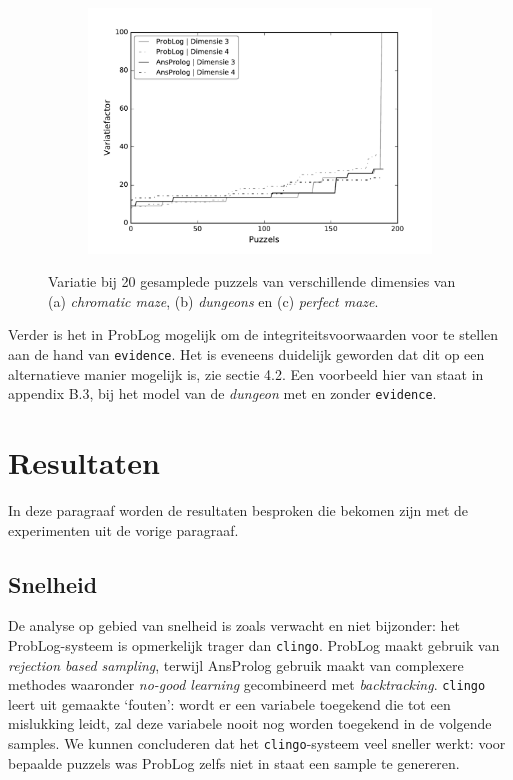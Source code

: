 \documentclass{article}
\begin{document}
\begin{figure}[t]
\begin{subfigure}{.33\textwidth}
  \includegraphics[width=\linewidth]{Grafieken/Variatie/Perfect Maze/perfectmaze.pdf}
  \caption{}
  \label{fig:sub3}
\end{subfigure}
\caption{Variatie bij 20 gesamplede puzzels van verschillende dimensies van (a) \textit{chromatic maze}, (b) \textit{dungeons} en (c) \textit{perfect maze}.}
\label{fig:test}
\end{figure}

Verder is het in ProbLog mogelijk om de integriteitsvoorwaarden voor te stellen aan de hand van \texttt{evidence}. Het is eveneens duidelijk geworden dat dit op een alternatieve manier mogelijk is, zie sectie 4.2. Een voorbeeld hier van staat in appendix B.3, bij het model van de \textit{dungeon} met en zonder \texttt{evidence}.



\section{Resultaten}
In deze paragraaf worden de resultaten besproken die bekomen zijn met de experimenten uit de vorige paragraaf. 
	\subsection{Snelheid}
	De analyse op gebied van snelheid is zoals verwacht en niet bijzonder: het ProbLog-systeem is opmerkelijk trager dan \texttt{clingo}. ProbLog maakt gebruik van \textit{rejection based sampling}, terwijl AnsProlog gebruik maakt van complexere methodes waaronder \textit{no-good learning} gecombineerd met \textit{backtracking}. 
	 \texttt{clingo} leert uit gemaakte `fouten': wordt er een variabele toegekend die tot een mislukking leidt, zal deze variabele nooit nog worden toegekend in de volgende samples. We kunnen concluderen dat het \texttt{clingo}-systeem veel sneller werkt: voor bepaalde puzzels was ProbLog zelfs niet in staat een sample te genereren.
	 
\end{document}
